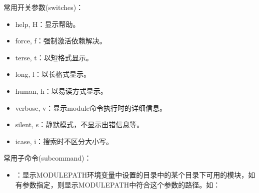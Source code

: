 \documentclass[a4paper,12pt,english]{sphinxmanual}
\begin{document}
\sphinxAtStartPar
常用开关参数(switches)：
\begin{itemize}
\item {} 
\sphinxAtStartPar
\sphinxhyphen{}\sphinxhyphen{}help, \sphinxhyphen{}H：显示帮助。

\item {} 
\sphinxAtStartPar
\sphinxhyphen{}\sphinxhyphen{}force, \sphinxhyphen{}f：强制激活依赖解决。

\item {} 
\sphinxAtStartPar
\sphinxhyphen{}\sphinxhyphen{}terse, \sphinxhyphen{}t：以短格式显示。

\item {} 
\sphinxAtStartPar
\sphinxhyphen{}\sphinxhyphen{}long, \sphinxhyphen{}l：以长格式显示。

\item {} 
\sphinxAtStartPar
\sphinxhyphen{}\sphinxhyphen{}human, \sphinxhyphen{}h：以易读方式显示。

\item {} 
\sphinxAtStartPar
\sphinxhyphen{}\sphinxhyphen{}verbose, \sphinxhyphen{}v：显示module命令执行时的详细信息。

\item {} 
\sphinxAtStartPar
\sphinxhyphen{}\sphinxhyphen{}silent, \sphinxhyphen{}s：静默模式，不显示出错信息等。

\item {} 
\sphinxAtStartPar
\sphinxhyphen{}\sphinxhyphen{}icase, \sphinxhyphen{}i：搜索时不区分大小写。

\end{itemize}

\sphinxAtStartPar
常用子命令(sub\sphinxhyphen{}command)：
\begin{itemize}
\item {} 
\sphinxAtStartPar
{}：显示MODULEPATH环境变量中设置的目录中的某个目录下可用的模块，如有参数指定，则显示MODULEPATH中符合这个参数的路径。如：

\end{itemize}
\end{document}
